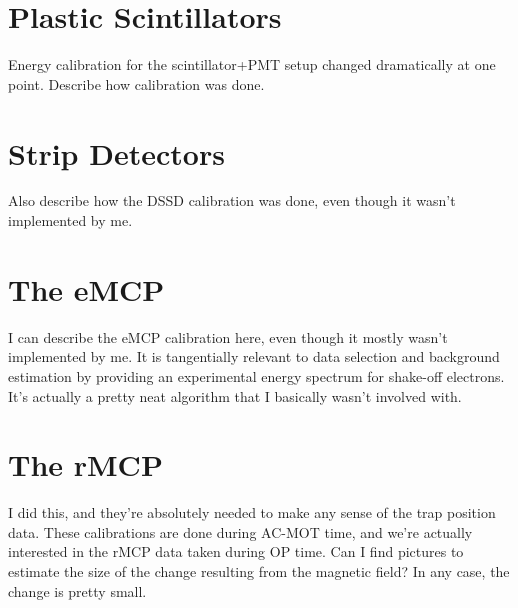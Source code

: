 \section{Plastic Scintillators}
	Energy calibration for the scintillator+PMT setup changed dramatically at one point.    Describe how calibration was done.  
	
\section{Strip Detectors}
	Also describe how the DSSD calibration was done, even though it wasn't implemented by me. 

\section{The eMCP}
	I can describe the eMCP calibration here, even though it mostly wasn't implemented by me.  It is tangentially relevant to data selection and background estimation by providing an experimental energy spectrum for shake-off electrons.  It's actually a pretty neat algorithm that I basically wasn't involved with.

\section{The rMCP}
	I did this, and they're absolutely needed to make any sense of the trap position data.  
	These calibrations are done during AC-MOT time, and we're actually interested in the rMCP data taken during OP time.  Can I find pictures to estimate the size of the change resulting from the magnetic field?  In any case, the change is pretty small.  












